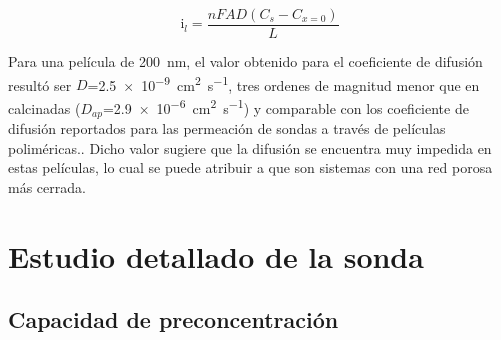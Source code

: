 			\begin{equation}
					\text{i}_l = \frac{nFAD(C_{s}-C_{x=0})}{L}
					\label{eq:de-ferroceno-bajaT}
			\end{equation}
			  	

		Para una película de \SI{200}{nm}, el valor obtenido para el coeficiente de difusión resultó ser $D$=\SI{2.5e-9}{\square\cm\per\second}, tres ordenes de magnitud menor que en \pdmF\space calcinadas ($D_{ap}$=\SI{2,9e-6}{\square\cm\per\second}) y comparable con los coeficiente de difusión reportados para las permeación de sondas a través de películas poliméricas.\cite{Kolb1993}. Dicho valor sugiere que la difusión se encuentra muy impedida en estas películas, lo cual se puede atribuir a que son sistemas con una red porosa más cerrada. 

\section{Estudio detallado de la sonda \texorpdfstring{\aminorutenioCompleto}{Ru(NH3)CL3}}
	
	\subsection{Capacidad de preconcentración}\label{sub:capacidad_de_preconcentraci_n}

